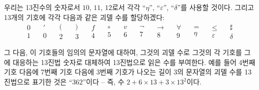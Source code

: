 \documentclass[12pt]{paper}
\begin{document}
우리는 13진수의 숫자로서 $10$, $11$, $12$로서 각각 ``$\eta$'', ``$\varepsilon$'', ``$\delta$''를 사용할 것이다.
그리고 13개의 기호에 각각 다음과 같은 괴델 수를 할당하겠다:
$$ \begin{matrix}
0 \\
1
\end{matrix} \quad
\begin{matrix}
' \\
0
\end{matrix} \quad
\begin{matrix}
( \\
2
\end{matrix} \quad
\begin{matrix}
) \\
3
\end{matrix} \quad
\begin{matrix}
f \\
4
\end{matrix} \quad
\begin{matrix}
\circ \\
5
\end{matrix} \quad
\begin{matrix}
v \\
6  
\end{matrix} \quad
\begin{matrix}
\lnot \\
7
\end{matrix} \quad
\begin{matrix}
\rightarrow \\
8
\end{matrix} \quad
\begin{matrix}
\forall \\
9
\end{matrix} \quad
\begin{matrix}
= \\
\eta
\end{matrix} \quad
\begin{matrix}
\leq \\
\varepsilon
\end{matrix} \quad
\begin{matrix}
\sharp \\
\delta
\end{matrix} $$

그 다음, 이 기호들의 임의의 문자열에 대하여,
그것의 괴델 수로 그것의 각 기호를 그에 대응하는 13진법 숫자로 대체하여 13진법으로 읽은 수를 부여한다.
예를 들어 4번째 기호 다음에 7번째 기호 다음에 3번째 기호가 나오는 길이 3의 문자열의 괴델 수를 13진법으로 표기한 것은 ``$362$''이다 --
즉, 수 $2 + 6 \times 13 + 3 \times 13^{2}$이다.
\end{document}
